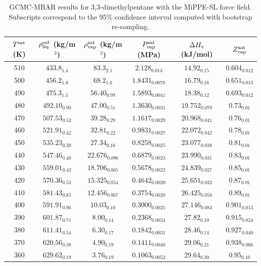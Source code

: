 \documentclass[journal=jctc,manuscript=article]{achemso}
\begin{document}
\begin{table}[htb!]
	\caption{GCMC-MBAR results for 3,3-dimethylpentane with the MiPPE-SL force field. Subscripts correspond to the 95\% confidence interval computed with bootstrap re-sampling.}
	\begin{center}
		\begin{tabular}{|c|c|c|c|c|c|}
			\hline
			$T^{\rm sat}$ (K) & $\rho_{\rm liq}^{\rm sat}$ (kg/m$^3$) & $\rho_{\rm vap}^{\rm sat}$ (kg/m$^3$) & $P_{\rm vap}^{\rm sat}$ (MPa) & $\Delta H_{\rm v}$ (kJ/mol) & $Z_{\rm vap}^{\rm sat}$ \\ \hline
			510 & $433.8_{1.4}$ & $83.3_{2.1}$ & $2.128_{0.013}$ & $14.92_{0.15}$ & $0.604_{0.012}$ \\
			500 & $456.2_{1.8}$ & $68.2_{1.6}$ & $1.8431_{0.0076}$ & $16.79_{0.16}$ & $0.651_{0.013}$ \\
			490 & $475.3_{1.5}$ & $56.40_{0.99}$ & $1.5893_{0.0041}$ & $18.38_{0.12}$ & $0.693_{0.012}$ \\
			480 & $492.10_{0.90}$ & $47.00_{0.51}$ & $1.3630_{0.0031}$ & $19.752_{0.070}$ & $0.73_{0.01}$ \\
			470 & $507.53_{0.52}$ & $39.28_{0.29}$ & $1.1617_{0.0029}$ & $20.968_{0.041}$ & $0.76_{0.01}$ \\
			460 & $521.91_{0.42}$ & $32.81_{0.22}$ & $0.9831_{0.0027}$ & $22.072_{0.042}$ & $0.78_{0.01}$ \\
			450 & $535.23_{0.39}$ & $27.34_{0.16}$ & $0.8258_{0.0025}$ & $23.077_{0.038}$ & $0.81_{0.01}$ \\
			440 & $547.46_{0.40}$ & $22.676_{0.096}$ & $0.6879_{0.0023}$ & $23.990_{0.031}$ & $0.83_{0.01}$ \\
			430 & $559.01_{0.43}$ & $18.706_{0.065}$ & $0.5678_{0.0022}$ & $24.839_{0.027}$ & $0.85_{0.01}$ \\
			420 & $570.36_{0.53}$ & $15.325_{0.054}$ & $0.4642_{0.0020}$ & $25.651_{0.032}$ & $0.87_{0.01}$ \\
			410 & $581.43_{0.85}$ & $12.456_{0.067}$ & $0.3754_{0.0020}$ & $26.425_{0.058}$ & $0.89_{0.01}$ \\
			400 & $591.91_{0.96}$ & $10.03_{0.10}$ & $0.3000_{0.0021}$ & $27.146_{0.083}$ & $0.901_{0.013}$ \\
			390 & $601.87_{0.71}$ & $8.00_{0.14}$ & $0.2368_{0.0024}$ & $27.82_{0.10}$ & $0.915_{0.024}$ \\
			380 & $611.41_{0.54}$ & $6.30_{0.17}$ & $0.1842_{0.0031}$ & $28.46_{0.14}$ & $0.927_{0.040}$ \\
			370 & $620.56_{0.38}$ & $4.90_{0.19}$ & $0.1411_{0.0040}$ & $29.06_{0.21}$ & $0.938_{0.066}$ \\
			360 & $629.62_{0.19}$ & $3.76_{0.19}$ & $0.1063_{0.0052}$ & $29.64_{0.30}$ & $0.95_{0.10}$ \\
			\hline
		\end{tabular}
	\end{center}
\end{table}
\end{document}
